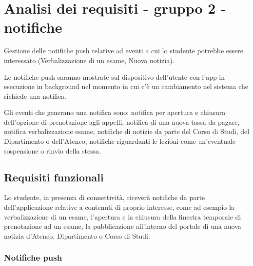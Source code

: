 
\chapter{Analisi dei requisiti - gruppo 2 - notifiche}
\label{ref:requisiti2-notifiche}

Gestione delle notifiche push relative ad eventi a cui lo studente potrebbe essere interessato (Verbalizzazione di un esame, Nuova notizia). 

Le notifiche push saranno mostrate sul dispositivo dell’utente con l’app in esecuzione in background nel momento in cui c’è un cambiamento nel sistema che richiede una notifica.  

Gli eventi che generano una notifica sono: notifica per apertura e chiusura dell'opzione di prenotazione agli appelli, notifica di una nuova tassa da pagare, notifica verbalizzazione esame, notifiche di notizie da parte del Corso di Studi, del Dipartimento o dell’Ateneo, notifiche riguardanti le lezioni come un’eventuale sospensione o rinvio della stessa.

\section{Requisiti funzionali}

Lo studente, in presenza di connettività, riceverà notifiche da parte dell’applicazione relative a contenuti di proprio interesse, come ad esempio la verbalizzazione di un esame, l’apertura e la chiusura della finestra temporale di prenotazione ad un esame, la pubblicazione all’interno del portale di una nuova notizia d’Ateneo, Dipartimento o Corso di Studi.

\subsection{Notifiche push \\} 

